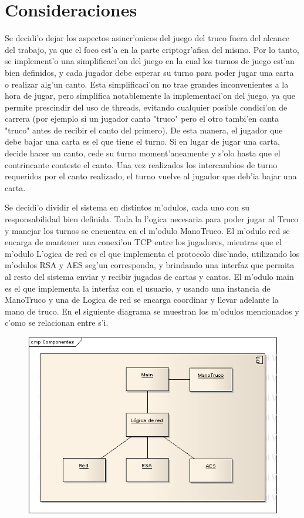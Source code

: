 \section{Consideraciones}
Se decidi'o dejar los aspectos asincr'onicos del juego del truco fuera del alcance del trabajo, ya que el foco est'a en la parte criptogr'afica del mismo.
Por lo tanto, se implement'o una simplificaci'on del juego en la cual los turnos de juego est'an bien definidos, y cada jugador debe esperar su turno para poder jugar una carta o realizar alg'un canto. Esta simplificaci'on no trae grandes inconvenientes a la hora de jugar, pero simplifica notablemente la implementaci'on del juego, ya que permite prescindir del uso de threads, evitando cualquier posible condici'on de carrera (por ejemplo si un jugador canta "truco" pero el otro tambi'en canta "truco" antes de recibir el canto del primero).
De esta manera, el jugador que debe bajar una carta es el que tiene el turno. Si en lugar de jugar una carta, decide hacer un canto, cede su turno moment'aneamente y s'olo hasta que el contrincante conteste el canto. Una vez realizados los intercambios de turno requeridos por el canto realizado, el turno vuelve al jugador que deb'ia bajar una carta.

Se decidi'o dividir el sistema en distintos m'odulos, cada uno con su responsabilidad bien definida. Toda la l'ogica necesaria para poder jugar al Truco y manejar los turnos se encuentra en el m'odulo ManoTruco. El m'odulo red se encarga de mantener una conexi'on TCP entre los jugadores, mientras que el m'odulo L'ogica de red es el que implementa el protocolo dise'nado, utilizando los m'odulos RSA y AES seg'un corresponda, y brindando una interfaz que permita al resto del sistema enviar y recibir jugadas de cartas y cantos. El m'odulo main es el que implementa la interfaz con el usuario, y usando una instancia de ManoTruco y una de Logica de red se encarga coordinar y llevar adelante la mano de truco.
En el siguiente diagrama se muestran los m'odulos mencionados y c'omo se relacionan entre s'i.

\begin{figure}
\includegraphics{Componentes.png}
\end{figure}

